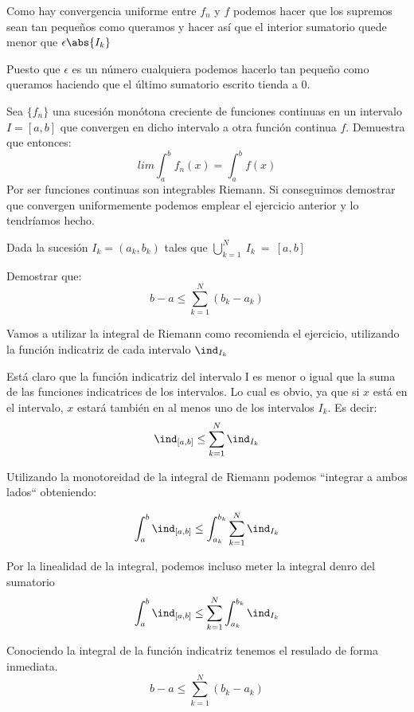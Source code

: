 \begin{problem}[5]
Como hay convergencia uniforme entre $f_n$ y $f$ podemos hacer que los supremos sean tan pequeños como queramos y hacer así que el interior sumatorio quede menor que $\epsilon \abs{I_k}$

Puesto que $\epsilon$ es un número cualquiera podemos hacerlo tan pequeño como queramos haciendo que el último sumatorio escrito tienda a 0.

\end{problem}

\begin{problem}[6]

Sea $\lbrace f_n \rbrace$ una sucesión monótona creciente de funciones continuas en un intervalo $I=[a,b]$ que convergen en dicho intervalo a otra función continua $f$. Demuestra que entonces:
\[ lim \int_{a}^{b} f_n(x) = \int_{a}^{b} f(x) \]
\solution
Por ser funciones continuas son integrables Riemann. Si conseguimos demostrar que convergen uniformemente podemos emplear el ejercicio anterior y lo tendríamos hecho.
\end{problem}

\begin{problem}[7]
Dada la sucesión $I_k = (a_k, b_k)$ tales que $\bigcup_{k=1}^{N}~I_k~=~[a,b]$

Demostrar que:
\[b-a \leq \sum_{k=1}^N (b_k - a_k)\]

\solution
Vamos a utilizar la integral de Riemann como recomienda el ejercicio, utilizando la función indicatriz de cada intervalo $\ind_{I_k}$

Está claro que la función indicatriz del intervalo I es menor o igual que la suma de las funciones indicatrices de los intervalos. Lo cual es obvio, ya que si $x$ está en el intervalo, $x$ estará también en al menos uno de los intervalos $I_k$. Es decir:
\[\ind_{[a,b]} \leq \sum_{k=1}^{N} \ind_{I_k}\]

Utilizando la monotoreidad de la integral de Riemann podemos ``integrar a ambos lados`` obteniendo:

\[\int_{a}^{b} \ind_{[a,b]} \leq \int_{a_k}^{b_k} \sum_{k=1}^{N} \ind_{I_k}\]

Por la linealidad de la integral, podemos incluso meter la integral denro del sumatorio
\[\int_{a}^{b} \ind_{[a,b]} \leq \sum_{k=1}^{N} \int_{a_k}^{b_k} \ind_{I_k}\]


Conociendo la integral de la función indicatriz tenemos el resulado de forma inmediata.
\[b-a \leq \sum_{k=1}^{N} ( b_k - a_k )\]

\end{problem}

